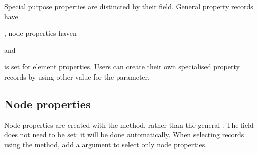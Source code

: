 Special purpose properties are distincted by their  field. General property records have {, node properties haven { and 
 { is set for element properties. Users can create their own specialised property records by using other value for the  parameter.


\subsection{Node properties}
\label{sec:node-properties}

Node properties are created with the  method, rather than the general . The  field does not need to be set: it will be done automatically. When selecting records using the  method, add a  argument to select only node properties.

}}}
